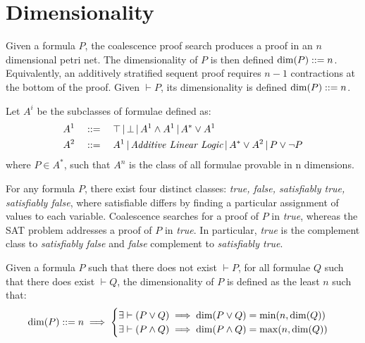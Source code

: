 \section{Dimensionality}
    
    \begin{definition}[Dimensionality]
        Given a formula $P$, the coalescence proof search produces a proof in an $n$ dimensional petri net.
        The dimensionality of $P$ is then defined $\dim(P) ::= n$.
        Equivalently, an additively stratified sequent proof requires $n - 1$ contractions at the bottom of the proof.
        Given $\vdash P$, its dimensionality is defined $\dim(P) ::= n$.
    \end{definition}

    \begin{examples}
    \end{examples}


    \begin{definition}
        Let $A^i$ be the subclasses of formulae defined as:
        \begin{align*}
            A^1 \quad &::= \quad \top \,|\, \bot \,|\, A^1 \wedge A^1 \,|\, A^* \vee A^1 \\
            A^2 \quad &::= \quad A^1 \,|\, \textit{Additive Linear Logic} \,|\, A^* \vee A^2 \,|\, P \vee \neg P
        \end{align*}
        where $P \in A^*$, such that $A^n$ is the class of all formulae provable in n dimensions.
    \end{definition}


    \begin{remark}
        For any formula $P$, there exist four distinct classes: \textit{true, false, satisfiably true, satisfiably false}, where satisfiable differs by finding a particular assignment of values to each variable.
        Coalescence searches for a proof of $P$ in \textit{true}, whereas the SAT problem addresses a proof of $P$ in \textit{true}.
        In particular, \textit{true} is the complement class to \textit{satisfiably false} and \textit{false} complement to \textit{satisfiably true}. %
    \end{remark}
    
    
    \begin{definition}
        Given a formula $P$ such that there does not exist $\vdash P$, for all formulae $Q$ such that there does exist $\vdash Q$, the dimensionality of $P$ is defined as the least $n$ such that:
        \begin{equation*}
            \dim(P) ::= n \implies 
            \begin{cases}
                \exists \vdash (P \vee Q) \implies \dim(P \vee Q) = \min(n, \dim(Q)) \\
                \exists \vdash (P \wedge Q) \implies \dim(P \wedge Q) = \max(n, \dim(Q))
            \end{cases}
        \end{equation*}
    \end{definition}


